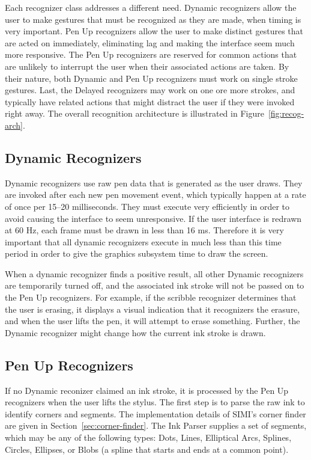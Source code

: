 

Each recognizer class addresses a different need. Dynamic recognizers
allow the user to make gestures that must be recognized as they are
made, when timing is very important. Pen Up recognizers allow the user
to make distinct gestures that are acted on immediately, eliminating
lag and making the interface seem much more responsive. The Pen Up
recognizers are reserved for common actions that are unlikely to
interrupt the user when their associated actions are taken. By their
nature, both Dynamic and Pen Up recognizers must work on single stroke
gestures. Last, the Delayed recognizers may work on one ore more
strokes, and typically have related actions that might distract the
user if they were invoked right away. The overall recognition
architecture is illustrated in Figure~\ref{fig:recog-arch}.

\subsection{Dynamic Recognizers}

Dynamic recognizers use raw pen data that is generated as the user
draws. They are invoked after each new pen movement event, which
typically happen at a rate of once per 15--20 milliseconds. They must
execute very efficiently in order to avoid causing the interface to
seem unresponsive. If the user interface is redrawn at 60 Hz, each
frame must be drawn in less than 16 ms. Therefore it is very important
that all dynamic recognizers execute in much less than this time
period in order to give the graphics subsystem time to draw the
screen.

When a dynamic recognizer finds a positive result, all other Dynamic
recognizers are temporarily turned off, and the associated ink stroke
will not be passed on to the Pen Up recognizers. For example, if the
scribble recognizer determines that the user is erasing, it displays a
visual indication that it recognizers the erasure, and when the user
lifts the pen, it will attempt to erase something. Further, the
Dynamic recognizer might change how the current ink stroke is drawn.

\subsection{Pen Up Recognizers}

If no Dynamic reconizer claimed an ink stroke, it is processed by the
Pen Up recognizers when the user lifts the stylus. The first step is
to parse the raw ink to identify corners and segments. The
implementation details of SIMI's corner finder are given in
Section~\ref{sec:corner-finder}. The Ink Parser supplies a set of
segments, which may be any of the following types: Dots, Lines,
Elliptical Arcs, Splines, Circles, Ellipses, or Blobs (a spline that
starts and ends at a common point).

